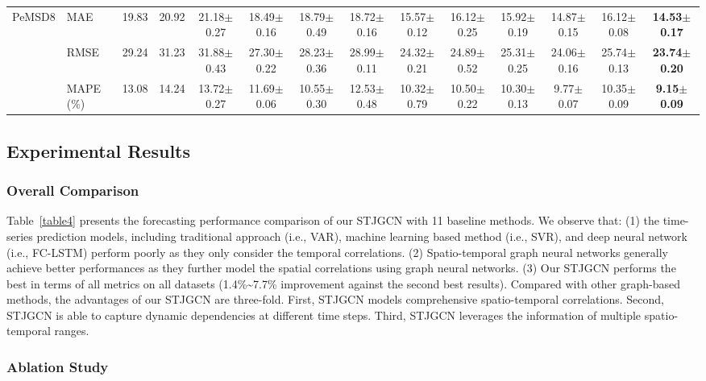 \documentclass[10pt,journal,compsoc]{IEEEtran}
\begin{document}
\begin{table*}
{\begin{tabular}{llccccccccccc|c}
		\midrule
		\multirow{3}{*}{PeMSD8} &MAE       &19.83 &20.92 &21.18$\pm$0.27 &18.49$\pm$0.16 &18.79$\pm$0.49 &18.72$\pm$0.16 &15.57$\pm$0.12 &16.12$\pm$0.25 &15.92$\pm$0.19 &14.87$\pm$0.15 &16.12$\pm$0.08 &\textbf{14.53$\pm$0.17} \\
								&RMSE      &29.24 &31.23 &31.88$\pm$0.43 &27.30$\pm$0.22 &28.23$\pm$0.36 &28.99$\pm$0.11 &24.32$\pm$0.21 &24.89$\pm$0.52 &25.31$\pm$0.25 &24.06$\pm$0.16 &25.74$\pm$0.13 &\textbf{23.74$\pm$0.20} \\
								&MAPE (\%) &13.08 &14.24 &13.72$\pm$0.27 &11.69$\pm$0.06 &10.55$\pm$0.30 &12.53$\pm$0.48 &10.32$\pm$0.79 &10.50$\pm$0.22 &10.30$\pm$0.13 &9.77$\pm$0.07  &10.35$\pm$0.09 &\textbf{9.15$\pm$0.09} \\
		\bottomrule
	\end{tabular}}
\end{table*}

\subsection{Experimental Results}

\subsubsection{Overall Comparison}

Table~\ref{table4} presents the forecasting performance comparison of our STJGCN with 11 baseline methods. We observe that: (1) the time-series prediction models, including traditional approach (i.e., VAR), machine learning based method (i.e., SVR), and deep neural network (i.e., FC-LSTM) perform poorly as they only consider the temporal correlations. (2) Spatio-temporal graph neural networks generally achieve better performances as they further model the spatial correlations using graph neural networks. (3) Our STJGCN performs the best in terms of all metrics on all datasets (1.4\%\textasciitilde7.7\% improvement against the second best results). Compared with other graph-based methods, the advantages of our STJGCN are three-fold. First, STJGCN models comprehensive spatio-temporal correlations. Second, STJGCN is able to capture dynamic dependencies at different time steps. Third, STJGCN leverages the information of multiple spatio-temporal ranges. 

\subsubsection{Ablation Study}
\end{document}
